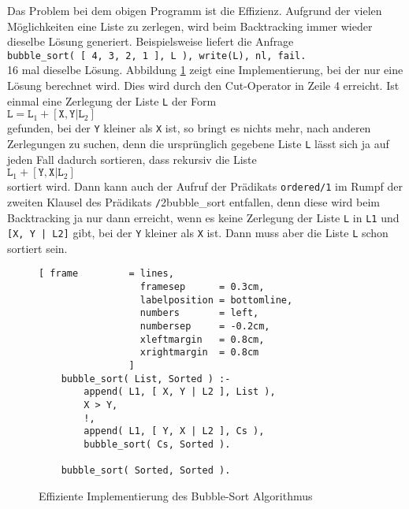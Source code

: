 Das Problem bei dem obigen Programm ist die Effizienz.  Aufgrund der vielen Möglichkeiten
eine Liste zu zerlegen, wird beim Backtracking immer wieder dieselbe Lösung generiert. 
Beispielsweise liefert die Anfrage \\[0.1cm]
\hspace*{1.3cm} \texttt{bubble\_sort( [ 4, 3, 2, 1 ], L ), write(L), nl, fail.} \\[0.1cm]
16 mal dieselbe Lösung.  Abbildung \ref{fig:bubble_sort_cut} zeigt eine Implementierung,
bei der nur eine Lösung berechnet wird.  Dies wird durch den Cut-Operator in Zeile 4
erreicht.   Ist einmal eine Zerlegung der Liste \texttt{L} der Form
\\[0.2cm]
\hspace*{1.3cm}
$\mathtt{L} = \texttt{L}_1 +[ \texttt{X}, \mathtt{Y} | \mathtt{L}_2]$
\\[0.2cm] 
gefunden, bei der \texttt{Y} kleiner als \texttt{X} ist, so bringt es
nichts mehr, nach anderen Zerlegungen zu suchen, denn die ursprünglich gegebene Liste
\texttt{L} lässt sich ja auf jeden Fall dadurch sortieren, dass rekursiv die Liste 
\\[0.2cm]
\hspace*{1.3cm}
 $\mathtt{L}_1 + [\mathtt{Y},\mathtt{X}|\mathtt{L}_2]$ 
\\[0.1cm]
sortiert wird.  Dann kann auch der Aufruf der Prädikats \texttt{ordered/1} im Rumpf der zweiten
Klausel des Prädikats \texttt/2{bubble\_sort} entfallen, denn diese wird beim Backtracking
ja nur dann erreicht, wenn es keine Zerlegung der Liste \texttt{L} in  \texttt{L1} und 
\texttt{[X, Y | L2]} gibt, bei der \texttt{Y} kleiner als \texttt{X} ist.  Dann muss aber
die Liste \texttt{L} schon sortiert sein.

\begin{figure}[!h]
  \centering
\begin{Verbatim}[ frame         = lines, 
                  framesep      = 0.3cm, 
                  labelposition = bottomline,
                  numbers       = left,
                  numbersep     = -0.2cm,
                  xleftmargin   = 0.8cm,
                  xrightmargin  = 0.8cm
                ]
    bubble_sort( List, Sorted ) :-
        append( L1, [ X, Y | L2 ], List ),
        X > Y,
        !,
        append( L1, [ Y, X | L2 ], Cs ),
        bubble_sort( Cs, Sorted ).
    
    bubble_sort( Sorted, Sorted ).
\end{Verbatim}
\vspace*{-0.3cm}
  \caption{Effiziente Implementierung des  Bubble-Sort Algorithmus}
  \label{fig:bubble_sort_cut}
\end{figure}

